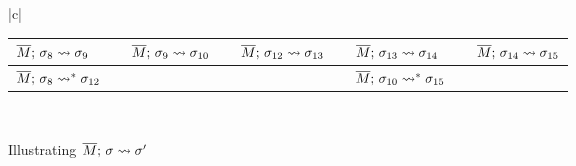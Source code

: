 \begin{figure}[htb]
\begin{tabular}{|c|}
 \hline %
 \\
\hline
\begin{tabular}{lclclclcl}
 $\overline{M};\, \sigma_8 \leadsto {\sigma_9} $  & &  $\overline{M};\, \sigma_9 \leadsto {\sigma_{10}} $ &  &
$\overline{M};\, \sigma_{12} \leadsto {\sigma_{13}} $ & &  $\overline{M};\, \sigma_{13} \leadsto {\sigma_{14}} $  &  & $\overline{M};\, \sigma_{14} \leadsto {\sigma_{15}} $
\\
\hline
$\overline{M};\, \sigma_8 \leadsto^* {\sigma_{12}}$ & & \ & & \ & & $\overline{M};\, \sigma_{10} \leadsto^* {\sigma_{15}}$
\\
\hline

\end{tabular}
\\
\hline
\end{tabular}
   \caption{Illustrating   $\overline{M};\, \sigma \leadsto {\sigma'}$
    }
   \label{fig:UpSemantics}
 \end{figure}
 
